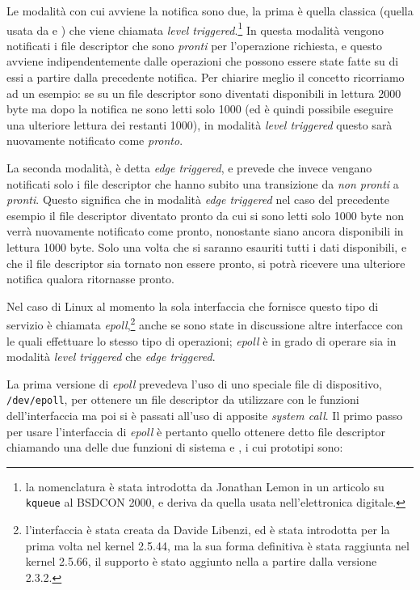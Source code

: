 Le modalità con cui avviene la notifica sono due, la prima è quella classica
(quella usata da  e ) che viene chiamata \textit{level
  triggered}.\footnote{la nomenclatura è stata introdotta da Jonathan Lemon in
  un articolo su \texttt{kqueue} al BSDCON 2000, e deriva da quella usata
  nell'elettronica digitale.} In questa modalità vengono notificati i file
descriptor che sono \textsl{pronti} per l'operazione richiesta, e questo
avviene indipendentemente dalle operazioni che possono essere state fatte su
di essi a partire dalla precedente notifica.  Per chiarire meglio il concetto
ricorriamo ad un esempio: se su un file descriptor sono diventati disponibili
in lettura 2000 byte ma dopo la notifica ne sono letti solo 1000 (ed è quindi
possibile eseguire una ulteriore lettura dei restanti 1000), in modalità
\textit{level triggered} questo sarà nuovamente notificato come
\textsl{pronto}.

La seconda modalità, è detta \textit{edge triggered}, e prevede che invece
vengano notificati solo i file descriptor che hanno subito una transizione da
\textsl{non pronti} a \textsl{pronti}. Questo significa che in modalità
\textit{edge triggered} nel caso del precedente esempio il file descriptor
diventato pronto da cui si sono letti solo 1000 byte non verrà nuovamente
notificato come pronto, nonostante siano ancora disponibili in lettura 1000
byte. Solo una volta che si saranno esauriti tutti i dati disponibili, e che
il file descriptor sia tornato non essere pronto, si potrà ricevere una
ulteriore notifica qualora ritornasse pronto.

Nel caso di Linux al momento la sola interfaccia che fornisce questo tipo di
servizio è chiamata \textit{epoll},\footnote{l'interfaccia è stata creata da
  Davide Libenzi, ed è stata introdotta per la prima volta nel kernel 2.5.44,
  ma la sua forma definitiva è stata raggiunta nel kernel 2.5.66, il supporto
  è stato aggiunto nella  a partire dalla versione 2.3.2.} anche se
sono state in discussione altre interfacce con le quali effettuare lo stesso
tipo di operazioni; \textit{epoll} è in grado di operare sia in modalità
\textit{level triggered} che \textit{edge triggered}.

La prima versione di \textit{epoll} prevedeva l'uso di uno speciale file di
dispositivo, \texttt{/dev/epoll}, per ottenere un file descriptor da
utilizzare con le funzioni dell'interfaccia ma poi si è passati all'uso di
apposite \textit{system call}.  Il primo passo per usare l'interfaccia di
\textit{epoll} è pertanto quello ottenere detto file descriptor chiamando una
delle due funzioni di sistema  e ,
i cui prototipi sono:

